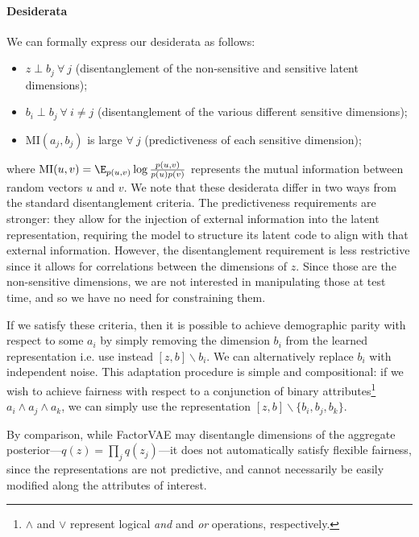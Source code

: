\paragraph{Desiderata}
We can formally express our desiderata as follows:
\begin{itemize}
    \item $z \perp b_j \medspace \forall \medspace j$ (disentanglement of the non-sensitive and sensitive latent dimensions);
    \item $b_i \perp b_j \medspace \forall \medspace i\neq j$ (disentanglement of the various different sensitive dimensions);
    \item $\text{MI}(a_j,  b_j)$ is large $\forall \medspace j$ (predictiveness of each sensitive dimension);
\end{itemize}
where $\text{MI}(u,v)=\E_{p(u,v)} \log \frac{p(u,v)}{p(u)p(v)}$ represents the mutual information between random vectors $u$ and $v$.
We note that these desiderata differ in two ways from the standard disentanglement criteria.
The predictiveness requirements are stronger: they allow for the injection of external information into the latent representation, requiring the model to structure its latent code to align with that external information.
However, the disentanglement requirement is less restrictive since it allows for correlations between the dimensions of $z$.
Since those are the non-sensitive dimensions, we are not interested in manipulating those at test time, and so we have no need for constraining them.

If we satisfy these criteria, then it is possible to achieve demographic parity with respect to some $a_i$ by simply removing the dimension $b_i$ from the learned representation i.e. use instead $[z,b]\backslash b_i$.
We can alternatively replace $b_i$ with independent noise.
This adaptation procedure is simple and compositional: if we wish to achieve fairness with respect to a conjunction of binary attributes\footnote{
$\wedge$ and $\vee$ represent logical \emph{and} and \emph{or} operations, respectively.
} $a_i \wedge a_j \wedge a_k$, we can simply use the representation $[z,b]\backslash \{b_i, b_j, b_k\}$.

By comparison, while FactorVAE may disentangle dimensions of the aggregate posterior---$q(z)=\prod_j q(z_j)$---it does not automatically satisfy flexible fairness, since the representations are not predictive, and cannot necessarily be easily modified along the attributes of interest.

